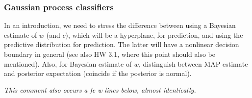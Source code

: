 \documentclass[11pt,twoside]{article}%
\theoremstyle{change}
\newenvironment{quote-env}{\begin{quote}\sffamily }{\end{quote}}
\newenvironment{mycomments-env}[1][Mycomments]{\textbf{#1.} \begin{quote-env} }{ \end{quote-env}  \ \rule{0.5em}{0.5em}}
\begin{document}
\newpage

\subsubsection{Gaussian process classifiers}

\bigskip\bigskip%
\begin{mycomments}%


\begin{mycomments-env}
In an introduction, we need to stress the difference between using a Bayesian
estimate of $w$ (and $c$), which will be a hyperplane, for prediction, and
using the predictive distribution for prediction. The latter will have a
nonlinear decision boundary in general (see also HW 3.1, where this point
should also be mentioned). Also, for Bayesian estimate of $w$, distinguish
between MAP estimate and posterior expectation (coincide if the posterior is normal).

\textit{This comment also occurs a fe w lines below, almost identically. }
\end{mycomments-env}%

\end{mycomments}%
\end{document}
